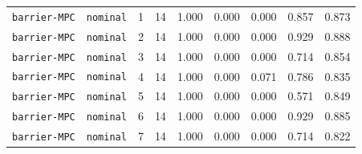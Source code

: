 \documentclass{article}
\begin{document}
\begin{center}
{\begin{tabular}{llllccccc}
\texttt{barrier-MPC} & \texttt{nominal} & 1 & 14 & 1.000 & 0.000 & 0.000 & 0.857 & 0.873 \\
\texttt{barrier-MPC} & \texttt{nominal} & 2 & 14 & 1.000 & 0.000 & 0.000 & 0.929 & 0.888 \\
\texttt{barrier-MPC} & \texttt{nominal} & 3 & 14 & 1.000 & 0.000 & 0.000 & 0.714 & 0.854 \\
\texttt{barrier-MPC} & \texttt{nominal} & 4 & 14 & 1.000 & 0.000 & 0.071 & 0.786 & 0.835 \\
\texttt{barrier-MPC} & \texttt{nominal} & 5 & 14 & 1.000 & 0.000 & 0.000 & 0.571 & 0.849 \\
\texttt{barrier-MPC} & \texttt{nominal} & 6 & 14 & 1.000 & 0.000 & 0.000 & 0.929 & 0.885 \\
\texttt{barrier-MPC} & \texttt{nominal} & 7 & 14 & 1.000 & 0.000 & 0.000 & 0.714 & 0.822 \\
\bottomrule
\end{tabular}%
}
\end{center}
\normalsize
\end{document}
